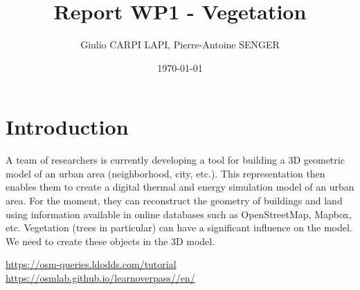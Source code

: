 \documentclass[11pt]{article}
\begin{document}
\title{Report WP1 - Vegetation}
\author{Giulio CARPI LAPI, Pierre-Antoine SENGER}
\date{\today}
\maketitle

\section{Introduction}

A team of researchers is currently developing a tool for building a 3D geometric model of an urban area (neighborhood, city, etc.).
This representation then enables them to create a digital thermal and energy simulation model of an urban area.
For the moment, they can reconstruct the geometry of buildings and land using information available in online databases such as OpenStreetMap, Mapbox, etc.
Vegetation (trees in particular) can have a significant influence on the model. We need to create these objects in the 3D model.


\begin{thebibliography}{9}
	 \url{https://osm-queries.ldodds.com/tutorial}
	 \url{https://osmlab.github.io/learnoverpass//en/}

\end{thebibliography}
\end{document}
